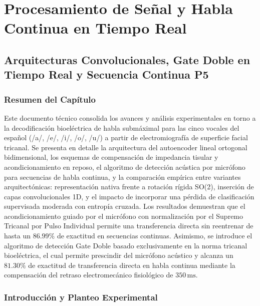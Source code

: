 \documentclass[11pt,a4paper,openany]{book}
\theoremstyle{definition}
\begin{document}
\part{Procesamiento de Señal y Habla Continua en Tiempo Real}

\chapter{Arquitecturas Convolucionales, Gate Doble en Tiempo Real y Secuencia Continua P5}
\label{chap:arquitecturas_gate_doble}



\section*{Resumen del Capítulo}
Este documento técnico consolida los avances y análisis experimentales en torno a la decodificación bioeléctrica de habla submáximal para las cinco vocales del español (/a/, /e/, /i/, /o/, /u/) a partir de electromiografía de superficie facial tricanal. Se presenta en detalle la arquitectura del autoencoder lineal ortogonal bidimensional, los esquemas de compensación de impedancia tisular y acondicionamiento en reposo, el algoritmo de detección acústica por micrófono para secuencias de habla continua, y la comparación empírica entre variantes arquitectónicas: representación nativa frente a rotación rígida SO(2), inserción de capas convolucionales 1D, y el impacto de incorporar una pérdida de clasificación supervisada moderada con entropía cruzada. Los resultados demuestran que el acondicionamiento guiado por el micrófono con normalización por el Supremo Tricanal por Pulso Individual permite una transferencia directa sin reentrenar de hasta un $86.99\%$ de exactitud en secuencias continuas. Asimismo, se introduce el algoritmo de detección Gate Doble basado exclusivamente en la norma tricanal bioeléctrica, el cual permite prescindir del micrófono acústico y alcanza un $81.30\%$ de exactitud de transferencia directa en habla continua mediante la compensación del retraso electromecánico fisiológico de $350\,\text{ms}$.


\vspace{0.3cm}

\newpage

\section{Introducción y Planteo Experimental}
\label{sec:introduccion}
\end{document}
